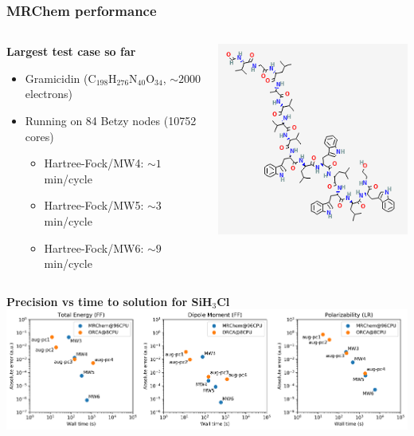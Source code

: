 \begin{frame}
\frametitle{MRChem performance}

\begin{columns}
\begin{column}[b]{0.60\linewidth}
\centering
\textbf{Largest test case so far}
\begin{itemize}
    \item Gramicidin (C$_{198}$H$_{276}$N$_{40}$O$_{34}$, $\sim 2000$ electrons)
    \item Running on 84 Betzy nodes (10752 cores)
    \begin{itemize}
        \item Hartree-Fock/MW4: $\sim 1$ min/cycle
        \item Hartree-Fock/MW5: $\sim 3$ min/cycle
        \item Hartree-Fock/MW6: $\sim 9$ min/cycle
    \end{itemize}
\end{itemize}

\vspace{5mm}

\end{column}

\begin{column}[b]{0.4\linewidth}

\vspace{-25mm}

\includegraphics[scale=0.5]{figures/gramicidin.png}
\end{column}
\end{columns}

\centering
\textbf{Precision vs time to solution for SiH$_3$Cl}
\includegraphics[scale=0.38]{figures/sih3cl.png}

\end{frame}

